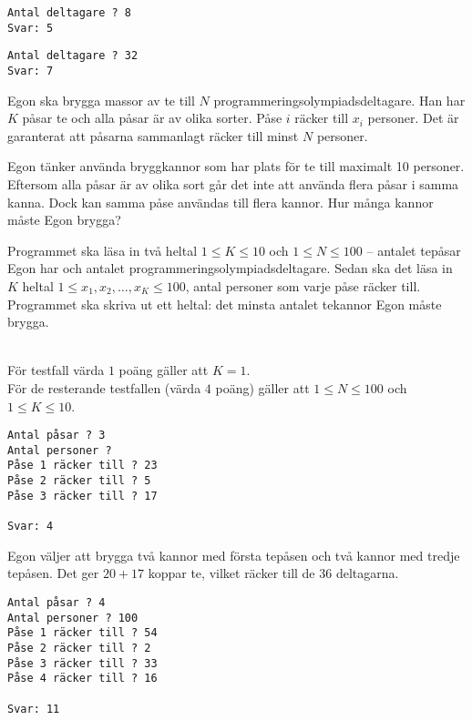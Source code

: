 \begin{verbatim}
Antal deltagare ? 8
Svar: 5
\end{verbatim}


\begin{verbatim}
Antal deltagare ? 32
Svar: 7
\end{verbatim}


\newpage
{}

Egon ska brygga massor av te till $N$ programmeringsolympiadsdeltagare.
Han har $K$ påsar te och alla påsar är av olika sorter.
Påse $i$ räcker till $x_i$ personer. Det är garanterat att påsarna sammanlagt räcker till minst $N$ personer.

Egon tänker använda bryggkannor som har plats för te till maximalt 10 personer.
Eftersom alla påsar är av olika sort
går det inte att använda flera påsar i samma kanna.
Dock kan samma påse användas till flera kannor. Hur många kannor måste Egon brygga?

Programmet ska läsa in två heltal $1 \le K \le 10$ och $1 \le N \le 100$ 
 -- antalet tepåsar Egon har och antalet programmeringsolympiadsdeltagare. 
Sedan ska det läsa in $K$ heltal $1 \le x_1, x_2, \dots, x_K \le 100$,
antal personer som varje påse räcker till. Programmet ska skriva ut ett heltal: det minsta antalet tekannor Egon måste brygga. 

\\
För testfall värda $1$ poäng gäller att $K=1$. \\
För de resterande testfallen (värda $4$ poäng) gäller att $1\leq N\leq 100$ och $1\leq K\leq 10$.

\begin{verbatim}
Antal påsar ? 3
Antal personer ?
Påse 1 räcker till ? 23
Påse 2 räcker till ? 5
Påse 3 räcker till ? 17

Svar: 4
\end{verbatim}


Egon väljer att brygga två kannor med första tepåsen 
och två kannor med tredje tepåsen. Det ger $20+17$ koppar te, vilket
räcker till de 36 deltagarna.


\begin{verbatim}
Antal påsar ? 4
Antal personer ? 100
Påse 1 räcker till ? 54
Påse 2 räcker till ? 2
Påse 3 räcker till ? 33
Påse 4 räcker till ? 16

Svar: 11
\end{verbatim}


